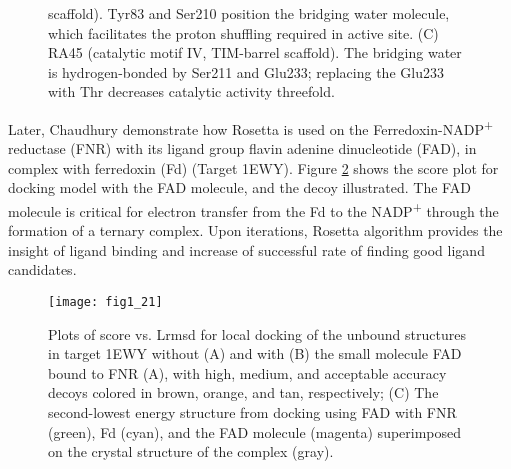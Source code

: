 \begin{refsection}
\begin{figure}[h!]
{        scaffold). Tyr83 and Ser210 position the bridging water molecule, which
        facilitates the proton shuffling required in active site. (C) RA45
        (catalytic motif IV, TIM-barrel scaffold). The bridging water is
        hydrogen-bonded by Ser211 and Glu233; replacing the Glu233 with Thr
        decreases catalytic activity threefold\cite{Jiang2008}.} 
        \label{fig:rosetta-enzyme} 
\end{figure}
Later, Chaudhury  demonstrate how Rosetta is used on the
Ferredoxin-NADP\textsuperscript{+} reductase (FNR) with its ligand group flavin
adenine dinucleotide (FAD), in complex with ferredoxin (Fd) (Target
1EWY)\cite{Chaudhury2011}. Figure \ref{fig:macro-ligand} shows the score plot
for docking model with the FAD molecule, and the decoy illustrated. The FAD
molecule is critical for electron transfer from the Fd to the
NADP\textsuperscript{+} through the formation of a ternary complex\cite{Hermoso2002}.
Upon iterations, Rosetta algorithm provides the insight of ligand binding and
increase of successful rate of finding good ligand candidates. 
\begin{figure}[h!] \centering \texttt{[image: fig1\_21]}
    \caption[Plots of score vs. Lrmsd for local docking of the unbound
        structures in target 1EWY without (A) and with (B) the small molecule
        FAD bound to FNR (A), with high, medium, and acceptable accuracy decoys
        colored in brown, orange, and tan, respectively; (C) The second-lowest
        energy structure from docking using FAD with FNR (green), Fd (cyan),
        and the FAD molecule (magenta) superimposed on the crystal structure of
    the complex (gray)] {Plots of score vs. Lrmsd for local docking of the
        unbound structures in target 1EWY without (A) and with (B) the small
        molecule FAD bound to FNR (A), with high, medium, and acceptable
        accuracy decoys colored in brown, orange, and tan, respectively; (C)
        The second-lowest energy structure from docking using FAD with FNR
        (green), Fd (cyan), and the FAD molecule (magenta) superimposed on the
        crystal structure of the complex (gray)\cite{Chaudhury2011}.} 
        \label{fig:macro-ligand} 
\end{figure}


\end{refsection}
